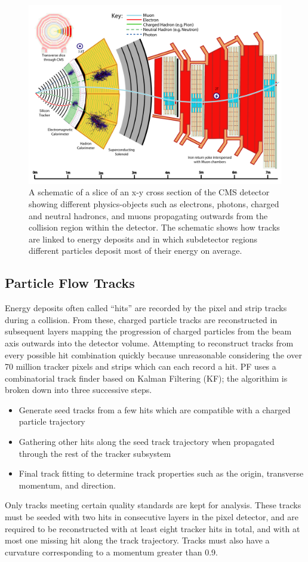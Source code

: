 \begin{figure}[htbp]
\centering
     \includegraphics[width=1.0\textwidth]{object_reconstruction_and_selection/plots/cms_slice.pdf}
     \caption{
A schematic of a slice of an x-y cross section of the CMS detector showing different
physics-objects such as electrons, photons, charged and neutral hadroncs, and muons
propagating outwards from the collision region within the detector. The schematic
shows how tracks are linked to energy deposits and in which subdetector regions different
particles deposit most of their energy on average.
     }
     \label{fig:cms_slice}
\end{figure}


\subsection{Particle Flow Tracks}
Energy deposits often called ``hits'' are recorded by the pixel and strip tracks during
a collision. From these, charged particle tracks are reconstructed in subsequent layers
mapping the progression of charged particles from the beam axis outwards into the detector
volume. Attempting to reconstruct tracks from every possible hit combination quickly
because unreasonable considering the over 70 million tracker pixels and strips which can
each record a hit. PF uses a combinatorial track finder based on Kalman 
Filtering (KF); the algorithim is broken down into three successive steps.
\begin{itemize}
\item Generate seed tracks from a few hits which are compatible with a charged
particle trajectory
\item Gathering other hits along the seed track trajectory when propagated through
the rest of the tracker subsystem
\item Final track fitting to determine track properties such as the origin, transverse
momentum, and direction.
\end{itemize}
Only tracks meeting certain quality standards are kept for analysis. These tracks must
be seeded with two hits in consecutive layers in the pixel detector, and are required 
to be reconstructed with at least eight tracker hits in total, and with at most one 
missing hit along the track trajectory. Tracks must also have a curvature corresponding
to a momentum greater than 0.9\GeV.

